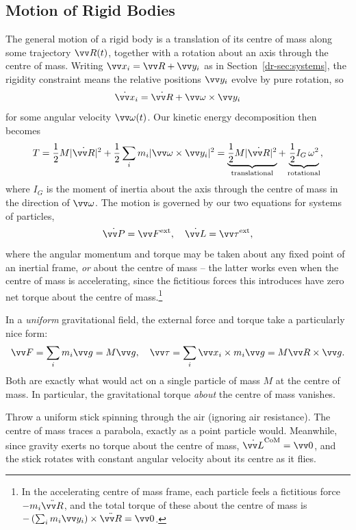 \subsection{Motion of Rigid Bodies}

The general motion of a rigid body is a translation of its centre of mass along some trajectory $\vv R(t)$, together with a rotation about an axis through the centre of mass. Writing $\vv x_i = \vv R + \vv y_i$ as in Section~\ref{dr-sec:systems}, the rigidity constraint means the relative positions $\vv y_i$ evolve by pure rotation, so
$$
\dot{\vv x}_i = \dot{\vv R} + \vv \omega \times \vv y_i
$$
for some angular velocity $\vv \omega(t)$. Our kinetic energy decomposition then becomes
$$
T = \frac{1}{2}M |\dot{\vv R}|^2 + \frac{1}{2}\sum_i m_i |\vv \omega \times \vv y_i|^2 = \underbrace{\frac{1}{2}M|\dot{\vv R}|^2}_{\text{translational}} + \underbrace{\frac{1}{2}I_G\, \omega^2}_{\text{rotational}},
$$
where $I_G$ is the moment of inertia about the axis through the centre of mass in the direction of $\vv \omega$. The motion is governed by our two equations for systems of particles,
$$
\dot{\vv P} = \vv F^{\text{ext}}, \quad \dot{\vv L} = \vv \tau^{\text{ext}},
$$
where the angular momentum and torque may be taken about any fixed point of an inertial frame, \emph{or} about the centre of mass -- the latter works even when the centre of mass is accelerating, since the fictitious forces this introduces have zero net torque about the centre of mass.\footnote{In the accelerating centre of mass frame, each particle feels a fictitious force $-m_i \ddot{\vv R}$, and the total torque of these about the centre of mass is $-\left(\sum_i m_i \vv y_i\right) \times \ddot{\vv R} = \vv 0$.}

In a \emph{uniform} gravitational field, the external force and torque take a particularly nice form:
$$
\vv F = \sum_i m_i \vv g = M \vv g, \quad \vv \tau = \sum_i \vv x_i \times m_i \vv g = M \vv R \times \vv g.
$$
Both are exactly what would act on a single particle of mass $M$ at the centre of mass. In particular, the gravitational torque \emph{about} the centre of mass vanishes.

\begin{example}
	Throw a uniform stick spinning through the air (ignoring air resistance). The centre of mass traces a parabola, exactly as a point particle would. Meanwhile, since gravity exerts no torque about the centre of mass, $\dot{\vv L}^{\text{CoM}} = \vv 0$, and the stick rotates with constant angular velocity about its centre as it flies.
\end{example}

